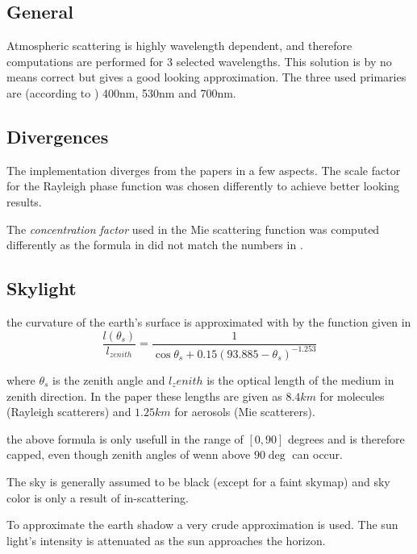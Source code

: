 \documentclass[12pt,a4paper]{scrartcl}
\begin{document}
\subsection{General}
Atmospheric scattering is highly wavelength dependent, and therefore computations are performed for 3 selected wavelengths. This solution is by no means correct but gives a good looking approximation. The three used primaries are (according to \cite{03ATI-LightScattering}) 400nm, 530nm and 700nm. 

\subsection{Divergences}
The implementation diverges from the papers in a few aspects. The scale factor for the Rayleigh phase function was chosen differently to achieve better looking results. 

The \emph{concentration factor} used in the Mie scattering function was computed differently as the formula in \cite{PreethamShirleySmits99A-practical-analytic} did not match the numbers in \cite{03ATI-LightScattering}.



\subsection{Skylight}
the curvature of the earth's surface is approximated with by the function given in \cite{03ATI-LightScattering}
\begin{equation}
\frac{l(\theta_s)}{l_{zenith}} = \frac{1}{\cos \theta_s + 0.15(93.885 - \theta_s)^{-1.253}}
\end{equation}

where $\theta_s$ is the zenith angle and $l_zenith$ is the optical length of the medium in zenith direction. In the paper these lengths are given as $8.4km$ for molecules (Rayleigh scatterers) and $1.25km$ for aerosols (Mie scatterers).

the above formula is only usefull in the range of $[0, 90]$ degrees and is therefore capped, even though zenith angles of wenn above $90\deg$ can occur. 

The sky is generally assumed to be black (except for a faint skymap) and sky color is only a result of in-scattering. 

To approximate the earth shadow a very crude approximation is used. The sun light's intensity is attenuated as the sun approaches the horizon. 
\end{document}
